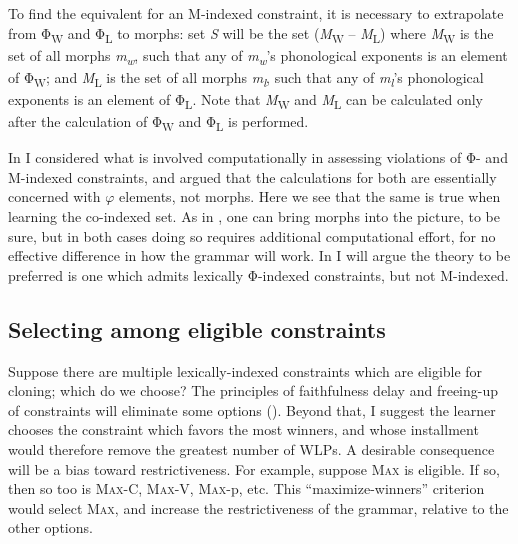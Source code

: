 \documentclass[output=paper,
modfonts
]{LSP/langsci}
\begin{document}
To find the equivalent for an M-indexed constraint, it is necessary to extrapolate from Φ\textsubscript{W} and Φ\textsubscript{L} to morphs: set \textit{S} will be the set (\textit{M}\textsubscript{W} -- \textit{M}\textsubscript{L}) where \textit{M}\textsubscript{W} is the set of all morphs \textit{m}\textit{\textsubscript{w}}, such that any of \textit{m}\textit{\textsubscript{w}}'s phonological exponents is an element of Φ\textsubscript{W}; and \textit{M}\textsubscript{L} is the set of all morphs \textit{m}\textit{\textsubscript{l}}, such that any of \textit{m}\textit{\textsubscript{l}}'s phonological exponents is an element of Φ\textsubscript{L}. Note that \textit{M}\textsubscript{W} and \textit{M}\textsubscript{L} can be calculated only after the calculation of Φ\textsubscript{W} and Φ\textsubscript{L} is performed.

In  I considered what is involved computationally in assessing violations of Φ- and M-indexed constraints, and argued that the calculations for both are essentially concerned with $\varphi $ elements, not morphs. Here we see that the same is true when learning the co-indexed set. As in , one can bring morphs into the picture, to be sure, but in both cases doing so requires additional computational effort, for no effective difference in how the grammar will work. In  I will argue the theory to be preferred is one which admits lexically Φ-indexed constraints, but not M-indexed.

\subsection[Selecting among eligible constraints]{Selecting among eligible constraints}\label{sec:round:8.3}
\label{bkm:Ref335677590}
Suppose there are multiple lexically-indexed constraints which are eligible for cloning; which do we choose? The principles of faithfulness delay and freeing-up of  constraints will eliminate some options (). Beyond that, I suggest the learner chooses the constraint which favors the most winners, and whose installment would therefore remove the greatest number of WLPs. A desirable consequence will be a bias toward restrictiveness. For example, suppose \textsc{Max} is eligible. If so, then so too is \textsc{Max}{}-C, \textsc{Max}{}-V, \textsc{Max}{}-p, etc. This ``maximize-winners'' criterion would select \textsc{Max}, and increase the restrictiveness of the grammar, relative to the other options.
\end{document}
